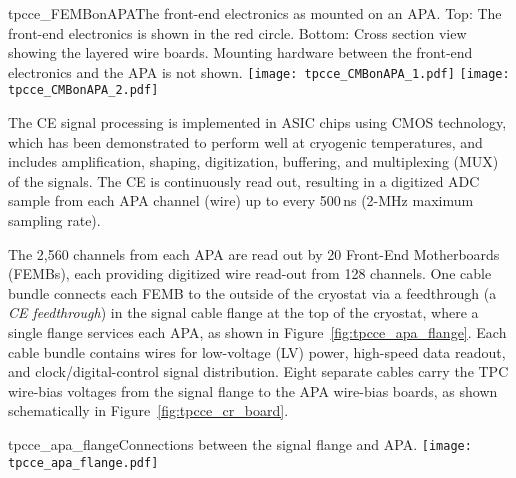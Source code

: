 \begin{cdrfigure}{tpcce_FEMBonAPA}{The 
front-end electronics as mounted on an APA.
  Top: The front-end electronics is shown in the red circle.
 Bottom: Cross section view showing the layered wire boards. Mounting hardware between the front-end electronics 
and the APA is not shown.}
\texttt{[image: tpcce\_CMBonAPA\_1.pdf]}
\texttt{[image: tpcce\_CMBonAPA\_2.pdf]}
\end{cdrfigure}

The CE signal processing is implemented in ASIC chips using CMOS technology,
which has been demonstrated to perform well at cryogenic temperatures,
and includes amplification, shaping, digitization, buffering, and multiplexing (MUX) of the signals.
The CE is continuously read out,
resulting in a digitized ADC sample from each APA channel (wire) up to every 500\,ns (2-MHz maximum sampling rate). 

The 2,560 channels from each APA are read out by 20 Front-End Motherboards (FEMBs), each providing 
digitized wire read-out from 128 channels. One cable bundle 
connects each FEMB to the outside of the cryostat via a feedthrough (a \textit{CE feedthrough}) in the signal cable flange at the top of the cryostat, where a single flange services each APA, as shown in Figure~\ref{fig:tpcce_apa_flange}. 
Each cable bundle contains wires for low-voltage (LV) power, high-speed data readout,
and clock/digital-control signal distribution.
Eight separate cables carry the TPC wire-bias voltages from the signal flange to the APA wire-bias boards, as
shown schematically in Figure~\ref{fig:tpcce_cr_board}.

\begin{cdrfigure}{tpcce_apa_flange}{Connections between
the signal flange and APA.}
\texttt{[image: tpcce\_apa\_flange.pdf]}
\end{cdrfigure}

